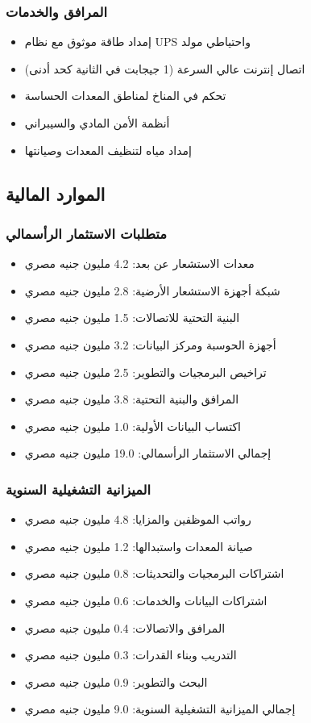 \subsubsection{المرافق والخدمات}
\begin{itemize}
    \item إمداد طاقة موثوق مع نظام UPS واحتياطي مولد
    \item اتصال إنترنت عالي السرعة (1 جيجابت في الثانية كحد أدنى)
    \item تحكم في المناخ لمناطق المعدات الحساسة
    \item أنظمة الأمن المادي والسيبراني
    \item إمداد مياه لتنظيف المعدات وصيانتها
\end{itemize}

\subsection{الموارد المالية}

\subsubsection{متطلبات الاستثمار الرأسمالي}
\begin{itemize}
    \item معدات الاستشعار عن بعد: 4.2 مليون جنيه مصري
    \item شبكة أجهزة الاستشعار الأرضية: 2.8 مليون جنيه مصري
    \item البنية التحتية للاتصالات: 1.5 مليون جنيه مصري
    \item أجهزة الحوسبة ومركز البيانات: 3.2 مليون جنيه مصري
    \item تراخيص البرمجيات والتطوير: 2.5 مليون جنيه مصري
    \item المرافق والبنية التحتية: 3.8 مليون جنيه مصري
    \item اكتساب البيانات الأولية: 1.0 مليون جنيه مصري
    \item إجمالي الاستثمار الرأسمالي: 19.0 مليون جنيه مصري
\end{itemize}

\subsubsection{الميزانية التشغيلية السنوية}
\begin{itemize}
    \item رواتب الموظفين والمزايا: 4.8 مليون جنيه مصري
    \item صيانة المعدات واستبدالها: 1.2 مليون جنيه مصري
    \item اشتراكات البرمجيات والتحديثات: 0.8 مليون جنيه مصري
    \item اشتراكات البيانات والخدمات: 0.6 مليون جنيه مصري
    \item المرافق والاتصالات: 0.4 مليون جنيه مصري
    \item التدريب وبناء القدرات: 0.3 مليون جنيه مصري
    \item البحث والتطوير: 0.9 مليون جنيه مصري
    \item إجمالي الميزانية التشغيلية السنوية: 9.0 مليون جنيه مصري
\end{itemize}

